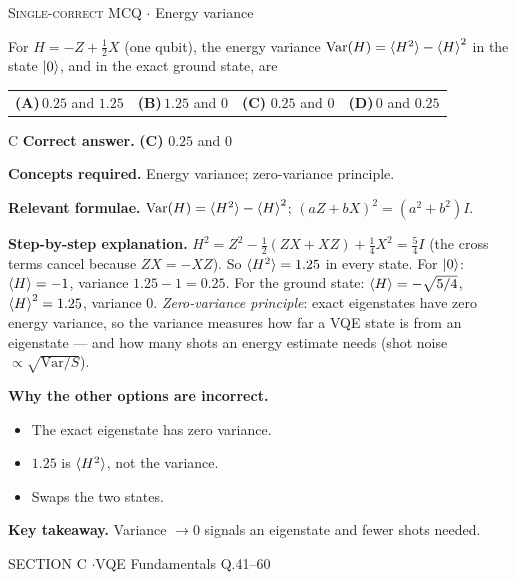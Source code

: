 \documentclass[11pt,a4paper]{article}
\newcommand{\optlabel}[1]{\textbf{(#1)}}
\newcommand{\correctlabel}[1]{\textcolor{okgreen}{\textbf{(#1)}\,\ding{51}}}
\newenvironment{qitem}[1]{\begin{list}{}{\setlength{\leftmargin}{3.3em}\setlength{\labelwidth}{3.1em}%
  \setlength{\labelsep}{0.2em}\setlength{\topsep}{3pt}\setlength{\parsep}{3pt}}\item[\textbf{Q.#1}\hfill]}{\end{list}}
\newcommand{\qsep}{\par\vspace{2pt}{\color{black!15}\hrule}\vspace{4pt}}
\newcommand{\qmeta}[2]{{\footnotesize\color{black!60}\textsc{#1} \;$\cdot$\; #2}\par}
\begin{document}
\begin{qitem}{40}
\qmeta{Single-correct MCQ}{Energy variance}
For $H = -Z + \tfrac12X$ (one qubit), the energy variance $\mathrm{Var}(H) = \braket{H^2} - \braket H^2$ in the state $\ket0$, and in the exact ground state, are
\par\smallskip\noindent\begin{tabularx}{\linewidth}{@{}*{4}{L}@{}}
\optlabel{A}\,$0.25$ and $1.25$ & \optlabel{B}\,$1.25$ and $0$ & \correctlabel{C}\,$0.25$ and $0$ & \optlabel{D}\,$0$ and $0.25$
\end{tabularx}
\end{qitem}
\begin{solbox}{C}
\textbf{\color{brand}Correct answer.} \textcolor{okgreen}{\textbf{(C)}} $0.25$ and $0$

\textbf{\color{brand}Concepts required.} Energy variance; zero-variance principle.

\textbf{\color{brand}Relevant formulae.} $\mathrm{Var}(H) = \braket{H^2} - \braket H^2$; $(aZ + bX)^2 = (a^2 + b^2)I$.

\textbf{\color{brand}Step-by-step explanation.} $H^2 = Z^2 - \tfrac12(ZX + XZ) + \tfrac14X^2 = \tfrac54I$ (the cross terms cancel because $ZX = -XZ$). So $\braket{H^2} = 1.25$ in every state.
For $\ket0$: $\braket H = -1$, variance $1.25 - 1 = 0.25$. For the ground state: $\braket H = -\sqrt{5/4}$, $\braket H^2 = 1.25$, variance $0$.
\emph{Zero-variance principle}: exact eigenstates have zero energy variance, so the variance measures how far a VQE state is from an
eigenstate --- and how many shots an energy estimate needs (shot noise $\propto \sqrt{\mathrm{Var}/S}$).

\textbf{\color{brand}Why the other options are incorrect.}
\begin{itemize}[leftmargin=2.4em, itemsep=1pt, topsep=2pt]
\item[\textbf{(A)}] The exact eigenstate has zero variance.
\item[\textbf{(B)}] $1.25$ is $\braket{H^2}$, not the variance.
\item[\textbf{(D)}] Swaps the two states.
\end{itemize}
\textbf{\color{brand}Key takeaway.} Variance $\to 0$ signals an eigenstate and fewer shots needed.
\end{solbox}
\qsep

\newpage

\begin{sectionbanner}SECTION C \enspace$\cdot$\enspace VQE Fundamentals \hfill Q.41--60\end{sectionbanner}
\end{document}
